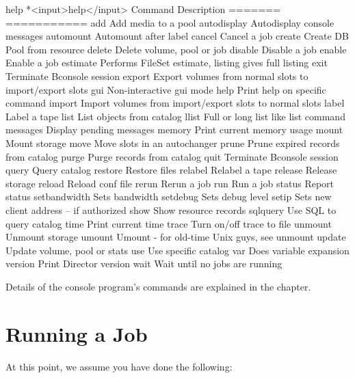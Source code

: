 \begin{bconsole}{help}
*<input>help</input>
  Command       Description
  =======       ===========
  add           Add media to a pool
  autodisplay   Autodisplay console messages
  automount     Automount after label
  cancel        Cancel a job
  create        Create DB Pool from resource
  delete        Delete volume, pool or job
  disable       Disable a job
  enable        Enable a job
  estimate      Performs FileSet estimate, listing gives full listing
  exit          Terminate Bconsole session
  export        Export volumes from normal slots to import/export slots
  gui           Non-interactive gui mode
  help          Print help on specific command
  import        Import volumes from import/export slots to normal slots
  label         Label a tape
  list          List objects from catalog
  llist         Full or long list like list command
  messages      Display pending messages
  memory        Print current memory usage
  mount         Mount storage
  move          Move slots in an autochanger
  prune         Prune expired records from catalog
  purge         Purge records from catalog
  quit          Terminate Bconsole session
  query         Query catalog
  restore       Restore files
  relabel       Relabel a tape
  release       Release storage
  reload        Reload conf file
  rerun         Rerun a job
  run           Run a job
  status        Report status
  setbandwidth  Sets bandwidth
  setdebug      Sets debug level
  setip         Sets new client address -- if authorized
  show          Show resource records
  sqlquery      Use SQL to query catalog
  time          Print current time
  trace         Turn on/off trace to file
  unmount       Unmount storage
  umount        Umount - for old-time Unix guys, see unmount
  update        Update volume, pool or stats
  use           Use specific catalog
  var           Does variable expansion
  version       Print Director version
  wait          Wait until no jobs are running
\end{bconsole}

Details of the console program's commands are explained in the
 chapter.

\section{Running a Job}
\label{Running}

At this point, we assume you have done the following:

